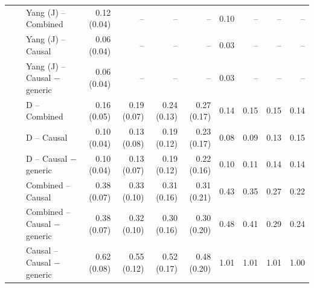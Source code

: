 \begin{tabular}{@{}lllrrrrrrrr@{}}
 &  & Yang (J) -- Combined & 0.12 (0.04) & -- & -- & -- & 0.10 & -- & -- & -- \\
 &  & Yang (J) -- Causal & 0.06 (0.04) & -- & -- & -- & 0.03 & -- & -- & -- \\
 &  & Yang (J) -- Causal $-$ generic & 0.06 (0.04) & -- & -- & -- & 0.03 & -- & -- & -- \\
 &  & D -- Combined & 0.16 (0.05) & 0.19 (0.07) & 0.24 (0.13) & 0.27 (0.17) & 0.14 & 0.15 & 0.15 & 0.14 \\
 &  & D -- Causal & 0.10 (0.04) & 0.13 (0.08) & 0.19 (0.12) & 0.23 (0.17) & 0.08 & 0.09 & 0.13 & 0.15 \\
 &  & D -- Causal $-$ generic & 0.10 (0.04) & 0.13 (0.07) & 0.19 (0.12) & 0.22 (0.16) & 0.10 & 0.11 & 0.14 & 0.14 \\
 &  & Combined -- Causal & 0.38 (0.07) & 0.33 (0.10) & 0.31 (0.16) & 0.31 (0.21) & 0.43 & 0.35 & 0.27 & 0.22 \\
 &  & Combined -- Causal $-$ generic & 0.38 (0.07) & 0.32 (0.10) & 0.30 (0.16) & 0.30 (0.20) & 0.48 & 0.41 & 0.29 & 0.24 \\
 &  & Causal -- Causal $-$ generic & 0.62 (0.08) & 0.55 (0.12) & 0.52 (0.17) & 0.48 (0.20) & 1.01 & 1.01 & 1.01 & 1.00 \\
\bottomrule
\end{tabular}
